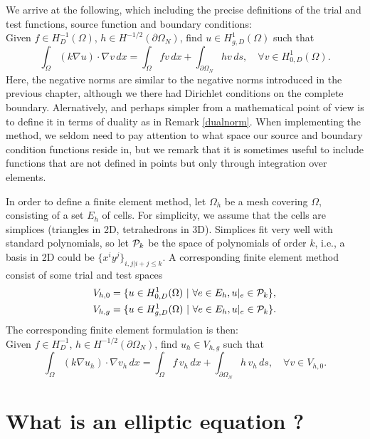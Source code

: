 We arrive at the following, which including the precise definitions of the trial and test functions, source function and boundary conditions: \\
Given $f\in H^{-1}_D(\Omega)$, $h\in H^{-1/2}(\partial \Omega_N)$,  
find $u\in  H^1_{g, D} (\Omega)$ such that  
\begin{equation}
\label{chp3:weak} 
\int_\Omega (k \nabla u) \cdot \nabla v \, dx = \int_\Omega f v \, dx + \int_{\partial \Omega_N} h v \, ds, \quad    \forall v\in  H^1_{0, D} (\Omega).  
\end{equation} 
Here, the negative norms are similar to the negative norms introduced in the previous chapter, although we there had Dirichlet conditions
on the complete boundary. Alernatively, and perhaps simpler from a mathematical point of view is to define it in terms of duality as
in Remark \ref{dualnorm}. When implementing the method, we seldom need to pay attention to what space our source and boundary condition functions reside in, but we remark
that it is sometimes useful to include functions that are not defined in points but only through integration over elements.  

In order to define a finite element method, let $\Omega_h$ be a mesh covering $\Omega$, consisting of a set $E_h$ of cells. 
For simplicity, we assume that the cells are simplices (triangles in 2D, tetrahedrons in 3D). Simplices 
fit very well with standard polynomials, so let ${\cal P}_k$ be the space of 
polynomials of order $k$, i.e., a basis in 2D could be $\{x^i y^{j} \}_{i,j | i+j \le k}$.   
A corresponding finite element method consist of some trial and test spaces 
\begin{align}
V_{h, 0}  &= \{ u \in H^1_{0,D}(\Omega) \ | \  \forall e \in E_h, u|_e \in {\cal P}_k \}, \\   
V_{h, g}  &= \{ u \in H^1_{g,D}(\Omega) \ | \  \forall e \in E_h, u|_e \in {\cal P}_k \} .  
\end{align}
The corresponding finite element formulation is then: \\ 
Given $f\in H^{-1}_D$, $h\in H^{-1/2}(\partial \Omega_N)$,  
find $u_h\in  V_{h, g} $ such that  
\begin{equation}
\label{chp3:fem} 
\int_\Omega (k \nabla u_h ) \cdot \nabla v_h \, dx = \int_\Omega f \, v_h \, dx + \int_{\partial \Omega_N} h \, v_h \, ds, \quad    \forall v\in  V_{h, 0} .  
\end{equation} 


\section{What is an elliptic equation ? }


